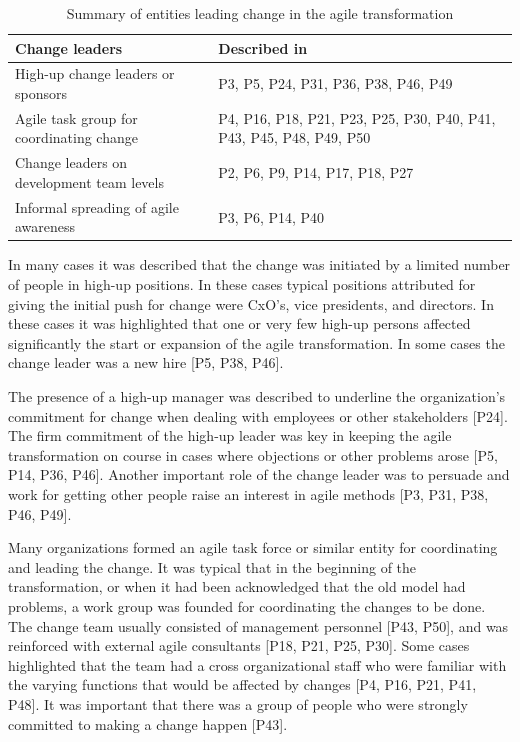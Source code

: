 \begin{table}[h]
    \centering
    \begin{tabular}{ >{\raggedright\arraybackslash}p{}
                     >{\raggedright\arraybackslash}p{} }
        \toprule
        Change leaders         &  Described in  \\
        \midrule
        High-up change leaders or sponsors  &
                P3, P5, P24, P31, P36, P38, P46, P49  \\
        Agile task group for coordinating change   &
                P4, P16, P18, P21, P23, P25, P30, P40, P41,
                P43, P45, P48, P49, P50  \\
        Change leaders on development team levels  &
                P2, P6, P9, P14, P17, P18, P27  \\
        Informal spreading of agile awareness  &
                P3, P6, P14, P40  \\
        \bottomrule
    \end{tabular}
    \caption{Summary of entities leading change in the agile transformation}
    \label{table:transformation_leadership}
\end{table}



In many cases it was described that the change was initiated by a limited number
of people in high-up positions. In these cases typical positions attributed for
giving the initial push for change were CxO's, vice presidents, and directors.
In these cases it was highlighted that one or very few high-up persons affected
significantly the start or expansion of the agile transformation. In some cases
the change leader was a new hire [P5, P38, P46].

The presence of a high-up manager was described to underline the organization's
commitment for change when dealing with employees or other stakeholders [P24].
The firm commitment of the high-up leader was key in keeping the agile
transformation on course in cases where objections or other problems arose [P5,
P14, P36, P46]. Another important role of the change leader was to persuade and
work for getting other people raise an interest in agile methods [P3, P31, P38,
P46, P49].


Many organizations formed an agile task force or similar entity for coordinating
and leading the change. It was typical that in the beginning of the
transformation, or when it had been acknowledged that the old model had
problems, a work group was founded for coordinating the changes to be done. The
change team usually consisted of management personnel [P43, P50], and was
reinforced with external agile consultants [P18, P21, P25, P30]. Some cases
highlighted that the team had a cross organizational staff who were familiar
with the varying functions that would be affected by changes [P4, P16, P21, P41,
P48]. It was important that there was a group of people who were strongly
committed to making a change happen [P43].

